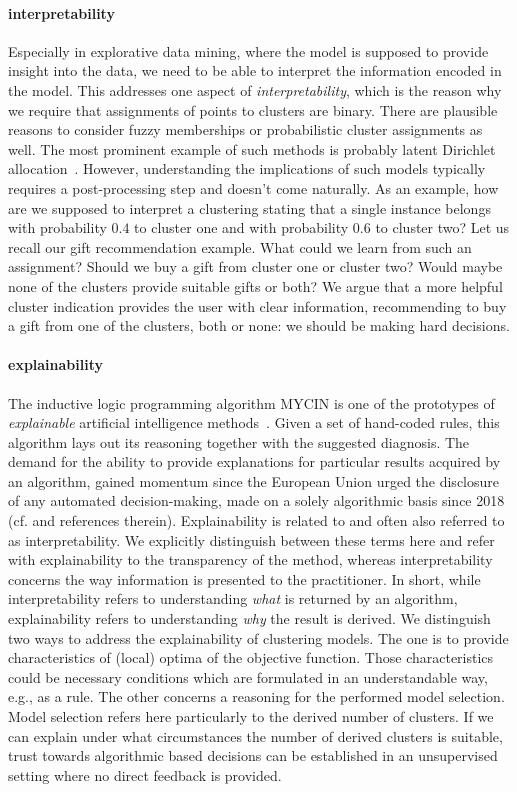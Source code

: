 \paragraph{interpretability} 
Especially in explorative data mining, where the model is supposed to provide insight into the data, we need to be able to interpret the information encoded in the model. This addresses one aspect of \emph{interpretability}, which is the reason why we require that assignments of points to clusters are binary. There are plausible reasons to consider fuzzy memberships or probabilistic cluster assignments as well. The most prominent example of such methods is probably latent Dirichlet allocation~\citep{blei2003latent}. However, understanding the implications of such models typically requires a post-processing step and doesn't come naturally. As an example, how are we supposed to interpret a clustering stating that a single instance belongs with probability $0.4$ to cluster one and with probability $0.6$ to cluster two? Let us recall our gift recommendation example. What could we learn from such an assignment? Should we buy a gift from cluster one or cluster two? Would maybe none of the clusters provide suitable gifts or both? We argue that a more helpful cluster indication provides the user with clear information, recommending to buy a gift from one of the clusters, both or none: we should be making hard decisions.
\paragraph{explainability} 
The inductive logic programming algorithm MYCIN is one of the prototypes of \emph{explainable} artificial intelligence methods~\citep{fagan1980computer}. Given a set of hand-coded rules, this algorithm lays out its reasoning together with the suggested diagnosis. 
The demand for the ability to provide explanations for particular results acquired by an algorithm, gained momentum since the European Union urged the disclosure of any automated decision-making, made on a solely algorithmic basis since 2018 (cf.\@ \cite{doshi2017towards} and references therein). Explainability is related to and often also referred to as interpretability. We explicitly distinguish between these terms here and refer with explainability to the transparency of the method, whereas interpretability concerns the way information is presented to the practitioner. In short, while interpretability refers to understanding \emph{what} is returned by an algorithm, explainability refers to understanding \emph{why} the result is derived. We distinguish two ways to address the explainability of clustering models. The one is to provide characteristics of (local) optima of the objective function. Those characteristics could be necessary conditions which are formulated in an understandable way, e.g., as a rule. The other concerns a reasoning for the performed model selection. Model selection refers here particularly to the derived number of clusters. If we can explain under what circumstances the number of derived clusters is suitable, trust towards algorithmic based decisions can be established in an unsupervised setting where no direct feedback is provided.
